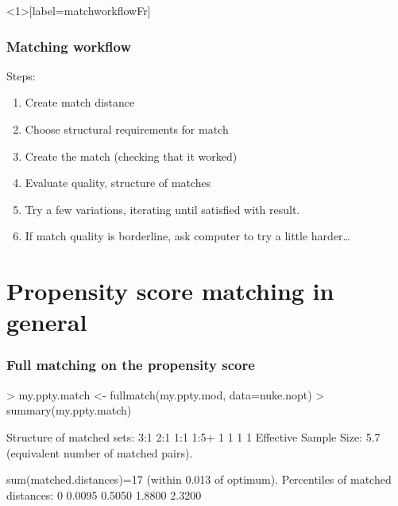 \begin{frame}<1>[label=matchworkflowFr]
  \frametitle{Matching workflow}
Steps:
    \begin{enumerate}
    \item Create match distance
    \item Choose structural requirements for match
    \item Create the match (checking that it worked)
    \item Evaluate quality, structure of matches
    \item Try a few variations, iterating until satisfied with result.
    \item<2-> If match quality is borderline, ask computer to try a little harder\ldots
    \end{enumerate}

\end{frame}



\section{Propensity score matching in general}


\begin{frame}[fragile]
  \frametitle{Full matching on the propensity score}

\begin{Schunk}
\begin{Sinput}
> my.ppty.match <- fullmatch(my.ppty.mod, data=nuke.nopt)
> summary(my.ppty.match)
\end{Sinput}
\begin{Soutput}
Structure of matched sets:
 3:1  2:1  1:1 1:5+ 
   1    1    1    1 
Effective Sample Size:  5.7 
(equivalent number of matched pairs).

sum(matched.distances)=17
(within 0.013 of optimum).
Percentiles of matched distances:
    0%    50%    95%   100% 
0.0095 0.5050 1.8800 2.3200 
\end{Soutput}
\end{Schunk}


\end{frame}

